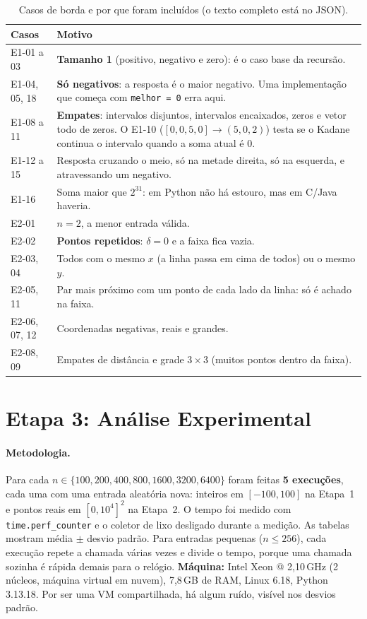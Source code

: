 \documentclass[11pt,a4paper]{article}
\begin{document}
\begin{table}[H]\centering\small
\begin{tabular}{p{2.1cm}p{12.6cm}}
\toprule
Casos & Motivo \\ \midrule
E1-01 a 03 & \textbf{Tamanho 1} (positivo, negativo e zero): é o caso base da recursão. \\
E1-04, 05, 18 & \textbf{Só negativos}: a resposta é o maior negativo. Uma implementação que começa com \texttt{melhor = 0} erra aqui. \\
E1-08 a 11 & \textbf{Empates}: intervalos disjuntos, intervalos encaixados, zeros e vetor todo de zeros. O E1-10 ($[0,0,5,0]\to(5,0,2)$) testa se o Kadane continua o intervalo quando a soma atual é 0. \\
E1-12 a 15 & Resposta cruzando o meio, só na metade direita, só na esquerda, e atravessando um negativo. \\
E1-16 & Soma maior que $2^{31}$: em Python não há estouro, mas em C/Java haveria. \\
E2-01 & $n=2$, a menor entrada válida. \\
E2-02 & \textbf{Pontos repetidos}: $\delta=0$ e a faixa fica vazia. \\
E2-03, 04 & Todos com o mesmo $x$ (a linha passa em cima de todos) ou o mesmo $y$. \\
E2-05, 11 & Par mais próximo com um ponto de cada lado da linha: só é achado na faixa. \\
E2-06, 07, 12 & Coordenadas negativas, reais e grandes. \\
E2-08, 09 & Empates de distância e grade $3\times3$ (muitos pontos dentro da faixa). \\
\bottomrule
\end{tabular}
\caption{Casos de borda e por que foram incluídos (o texto completo está no JSON).}
\end{table}

\section{Etapa 3: Análise Experimental}

\paragraph{Metodologia.} Para cada $n\in\{100,200,400,800,1600,3200,6400\}$ foram feitas \textbf{5 execuções}, cada uma com uma entrada aleatória nova: inteiros em $[-100,100]$ na Etapa~1 e pontos reais em $[0,10^4]^2$ na Etapa~2. O tempo foi medido com \texttt{time.perf\_counter} e o coletor de lixo desligado durante a medição. As tabelas mostram média $\pm$ desvio padrão. Para entradas pequenas ($n\le 256$), cada execução repete a chamada várias vezes e divide o tempo, porque uma chamada sozinha é rápida demais para o relógio. \textbf{Máquina:} Intel Xeon @ 2,10\,GHz (2 núcleos, máquina virtual em nuvem), 7,8\,GB de RAM, Linux 6.18, Python 3.13.18. Por ser uma VM compartilhada, há algum ruído, visível nos desvios padrão.
\end{document}
